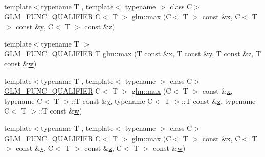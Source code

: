 \begin{DoxyCompactItemize}
\item 
{\footnotesize template$<$typename T , template$<$ typename $>$ class C$>$ }\\\hyperlink{setup_8hpp_a33fdea6f91c5f834105f7415e2a64407}{G\+L\+M\+\_\+\+F\+U\+N\+C\+\_\+\+Q\+U\+A\+L\+I\+F\+I\+ER} C$<$ T $>$ \hyperlink{group__gtx__extended__min__max_gaf832e9d4ab4826b2dda2fda25935a3a4}{glm\+::max} (C$<$ T $>$ const \&\hyperlink{_s_d_l__opengl_8h_ad0e63d0edcdbd3d79554076bf309fd47}{x}, C$<$ T $>$ const \&\hyperlink{_s_d_l__opengl_8h_a1675d9d7bb68e1657ff028643b4037e3}{y}, C$<$ T $>$ const \&\hyperlink{_s_d_l__opengl__glext_8h_a5e74030ebb3297ce1b37ff716fedd68f}{z})
\item 
{\footnotesize template$<$typename T $>$ }\\\hyperlink{setup_8hpp_a33fdea6f91c5f834105f7415e2a64407}{G\+L\+M\+\_\+\+F\+U\+N\+C\+\_\+\+Q\+U\+A\+L\+I\+F\+I\+ER} T \hyperlink{group__gtx__extended__min__max_ga78e04a0cef1c4863fcae1a2130500d87}{glm\+::max} (T const \&\hyperlink{_s_d_l__opengl_8h_ad0e63d0edcdbd3d79554076bf309fd47}{x}, T const \&\hyperlink{_s_d_l__opengl_8h_a1675d9d7bb68e1657ff028643b4037e3}{y}, T const \&\hyperlink{_s_d_l__opengl__glext_8h_a5e74030ebb3297ce1b37ff716fedd68f}{z}, T const \&\hyperlink{_s_d_l__opengl__glext_8h_a6ee8f168a7ab6785a9bb57c6715dad99}{w})
\item 
{\footnotesize template$<$typename T , template$<$ typename $>$ class C$>$ }\\\hyperlink{setup_8hpp_a33fdea6f91c5f834105f7415e2a64407}{G\+L\+M\+\_\+\+F\+U\+N\+C\+\_\+\+Q\+U\+A\+L\+I\+F\+I\+ER} C$<$ T $>$ \hyperlink{group__gtx__extended__min__max_ga7cca8b53cfda402040494cdf40fbdf4a}{glm\+::max} (C$<$ T $>$ const \&\hyperlink{_s_d_l__opengl_8h_ad0e63d0edcdbd3d79554076bf309fd47}{x}, typename C$<$ T $>$\+::T const \&\hyperlink{_s_d_l__opengl_8h_a1675d9d7bb68e1657ff028643b4037e3}{y}, typename C$<$ T $>$\+::T const \&\hyperlink{_s_d_l__opengl__glext_8h_a5e74030ebb3297ce1b37ff716fedd68f}{z}, typename C$<$ T $>$\+::T const \&\hyperlink{_s_d_l__opengl__glext_8h_a6ee8f168a7ab6785a9bb57c6715dad99}{w})
\item 
{\footnotesize template$<$typename T , template$<$ typename $>$ class C$>$ }\\\hyperlink{setup_8hpp_a33fdea6f91c5f834105f7415e2a64407}{G\+L\+M\+\_\+\+F\+U\+N\+C\+\_\+\+Q\+U\+A\+L\+I\+F\+I\+ER} C$<$ T $>$ \hyperlink{group__gtx__extended__min__max_gaacffbc466c2d08c140b181e7fd8a4858}{glm\+::max} (C$<$ T $>$ const \&\hyperlink{_s_d_l__opengl_8h_ad0e63d0edcdbd3d79554076bf309fd47}{x}, C$<$ T $>$ const \&\hyperlink{_s_d_l__opengl_8h_a1675d9d7bb68e1657ff028643b4037e3}{y}, C$<$ T $>$ const \&\hyperlink{_s_d_l__opengl__glext_8h_a5e74030ebb3297ce1b37ff716fedd68f}{z}, C$<$ T $>$ const \&\hyperlink{_s_d_l__opengl__glext_8h_a6ee8f168a7ab6785a9bb57c6715dad99}{w})

\end{DoxyCompactItemize}
